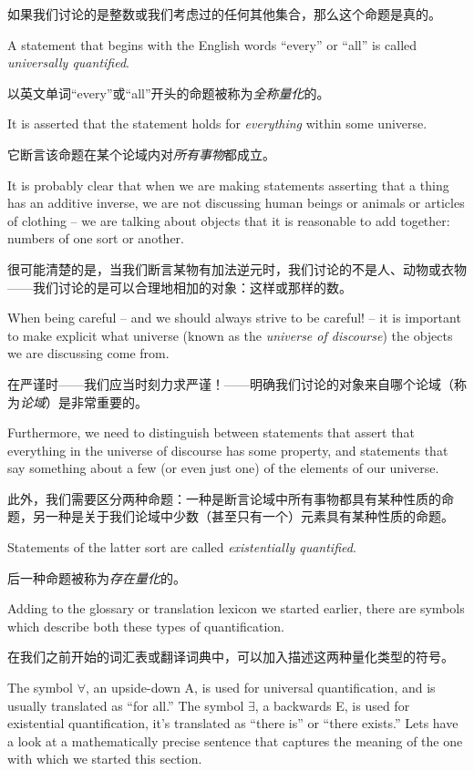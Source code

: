 如果我们讨论的是整数或我们考虑过的任何其他集合，那么这个命题是真的。

A statement that begins with the English
words ``every'' or ``all'' is called 
\emph{universally quantified}.

以英文单词“every”或“all”开头的命题被称为\emph{全称量化}的。

It is asserted that the statement holds for {\em everything} within
some universe.

它断言该命题在某个论域内对{\em 所有事物}都成立。

It is probably clear that when we are making
statements asserting that a thing has an additive inverse, we 
are not discussing human beings or animals or articles of clothing --
we are talking about objects that it is reasonable to add together:
numbers of one sort or another.

很可能清楚的是，当我们断言某物有加法逆元时，我们讨论的不是人、动物或衣物——我们讨论的是可以合理地相加的对象：这样或那样的数。

When being careful -- and we should always
strive to be careful! -- it is important to make explicit what 
universe (known as the \emph{universe of discourse}) the objects
we are discussing come from.

在严谨时——我们应当时刻力求严谨！——明确我们讨论的对象来自哪个论域（称为\emph{论域}）是非常重要的。

Furthermore, we need to distinguish 
between statements that assert that everything in the universe of
discourse has some property, and statements that say something
about a few (or even just one) of the elements of our universe.

此外，我们需要区分两种命题：一种是断言论域中所有事物都具有某种性质的命题，另一种是关于我们论域中少数（甚至只有一个）元素具有某种性质的命题。

Statements of the latter sort are called 
\emph{existentially quantified}.

后一种命题被称为\emph{存在量化}的。

Adding to the glossary or translation lexicon we started earlier,
there are symbols which describe both these types of quantification.

在我们之前开始的词汇表或翻译词典中，可以加入描述这两种量化类型的符号。

The symbol $\forall$, an upside-down A, is used for universal
quantification, and is usually translated as ``for all.''  
The symbol $\exists$, a backwards E, is used for existential
quantification, it's translated as ``there is'' or ``there exists.''
Lets have a look at a mathematically precise sentence that captures
the meaning of the one with which we started this section.

